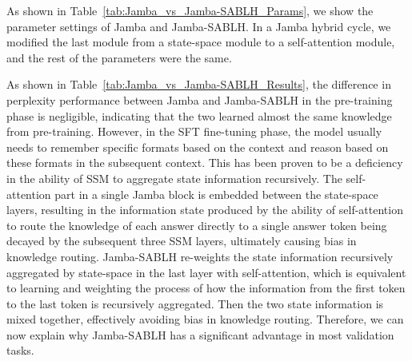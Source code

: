 \documentclass{article}
\theoremstyle{plain}
\theoremstyle{definition}
\theoremstyle{remark}
\begin{document}
As shown in Table~\ref{tab:Jamba_vs_Jamba-SABLH_Params}, we show the parameter settings of Jamba and Jamba-SABLH. In a Jamba hybrid cycle, we modified the last module from a state-space module to a self-attention module, and the rest of the parameters were the same.

As shown in Table~\ref{tab:Jamba_vs_Jamba-SABLH_Results}, the difference in perplexity performance between Jamba and Jamba-SABLH in the pre-training phase is negligible, indicating that the two learned almost the same knowledge from pre-training. However, in the SFT fine-tuning phase, the model usually needs to remember specific formats based on the context and reason based on these formats in the subsequent context. This has been proven to be a deficiency in the ability of SSM to aggregate state information recursively. The self-attention part in a single Jamba block is embedded between the state-space layers, resulting in the information state produced by the ability of self-attention to route the knowledge of each answer directly to a single answer token being decayed by the subsequent three SSM layers, ultimately causing bias in knowledge routing.
Jamba-SABLH re-weights the state information recursively aggregated by state-space in the last layer with self-attention, which is equivalent to learning and weighting the process of how the information from the first token to the last token is recursively aggregated. Then the two state information is mixed together, effectively avoiding bias in knowledge routing. Therefore, we can now explain why Jamba-SABLH has a significant advantage in most validation tasks.
\end{document}
